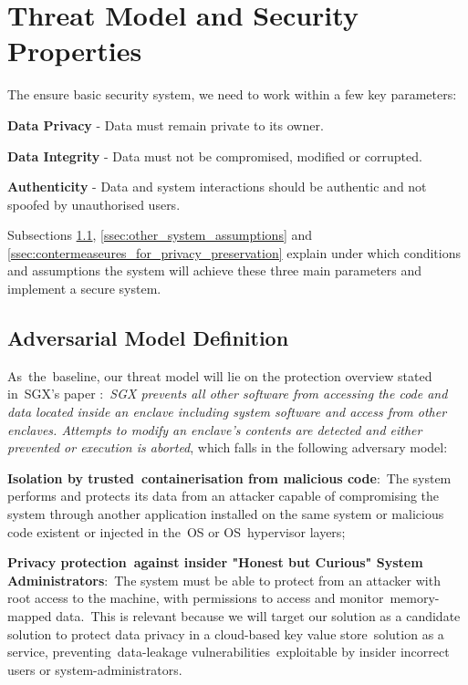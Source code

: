 \section{Threat Model and Security Properties}
\label{sec:threat_model_and_security_properties}

The ensure basic security system, we need to work within a few key parameters:
 
\textbf{Data Privacy} - Data must remain private to its owner.

\textbf{Data Integrity} - Data must not be compromised, modified or corrupted.

\textbf{Authenticity} - Data and system interactions should be authentic and not spoofed by unauthorised users.

Subsections \ref{ssec:adversarial_model_definition}, \ref{ssec:other_system_assumptions} and \ref{ssec:contermeaseures_for_privacy_preservation} explain under which conditions and assumptions the system will achieve these three main parameters and implement a secure system.

\subsection{Adversarial Model Definition}
\label{ssec:adversarial_model_definition}
	
As the baseline, our threat model will lie on the protection overview stated in SGX’s paper \cite{sgx:7}: \textit{SGX prevents all other software from accessing the code and data located inside an enclave including system software and access from other enclaves. Attempts to modify an enclave’s contents are detected and either prevented or execution is aborted}, which falls in the following adversary model:

\textbf{Isolation by trusted containerisation from malicious code}: The system performs and protects its data from an attacker capable of compromising the system through another application installed on the same system or malicious code existent or injected in the OS or OS hypervisor layers;

\textbf{Privacy protection against insider "Honest but Curious" System Administrators}: The system must be able to protect from an attacker with root access to the machine, with permissions to access and monitor memory-mapped data. This is relevant because we will target our solution as a candidate solution to protect data privacy in a cloud-based key value store solution as a service, preventing data-leakage vulnerabilities exploitable by insider incorrect users or system-administrators.

